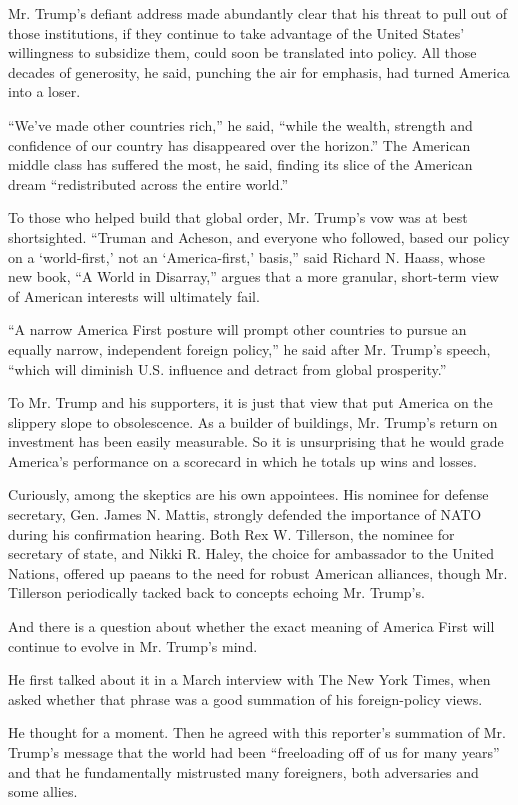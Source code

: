 Mr. Trump's defiant address made abundantly clear that his threat to
pull out of those institutions, if they continue to take advantage of
the United States' willingness to subsidize them, could soon be
translated into policy. All those decades of generosity, he said,
punching the air for emphasis, had turned America into a loser.

``We've made other countries rich,'' he said, ``while the wealth,
strength and confidence of our country has disappeared over the
horizon.'' The American middle class has suffered the most, he said,
finding its slice of the American dream ``redistributed across the
entire world.''

To those who helped build that global order, Mr. Trump's vow was at best
shortsighted. ``Truman and Acheson, and everyone who followed, based our
policy on a `world-first,' not an `America-first,' basis,'' said Richard
N. Haass, whose new book, ``A World in Disarray,'' argues that a more
granular, short-term view of American interests will ultimately fail.

``A narrow America First posture will prompt other countries to pursue
an equally narrow, independent foreign policy,'' he said after Mr.
Trump's speech, ``which will diminish U.S. influence and detract from
global prosperity.''

To Mr. Trump and his supporters, it is just that view that put America
on the slippery slope to obsolescence. As a builder of buildings, Mr.
Trump's return on investment has been easily measurable. So it is
unsurprising that he would grade America's performance on a scorecard in
which he totals up wins and losses.

Curiously, among the skeptics are his own appointees. His nominee for
defense secretary, Gen. James N. Mattis, strongly defended the
importance of NATO during his confirmation hearing. Both Rex W.
Tillerson, the nominee for secretary of state, and Nikki R. Haley, the
choice for ambassador to the United Nations, offered up paeans to the
need for robust American alliances, though Mr. Tillerson periodically
tacked back to concepts echoing Mr. Trump's.

And there is a question about whether the exact meaning of America First
will continue to evolve in Mr. Trump's mind.

He first talked about it in a March interview with The New York Times,
when asked whether that phrase was a good summation of his
foreign-policy views.

He thought for a moment. Then he agreed with this reporter's summation
of Mr. Trump's message that the world had been ``freeloading off of us
for many years'' and that he fundamentally mistrusted many foreigners,
both adversaries and some allies.

